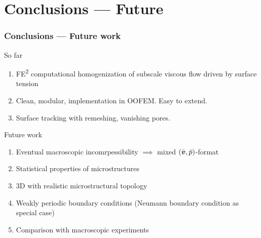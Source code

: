 \documentclass[11pt]{beamer} %
\begin{document}
\section{Conclusions --- Future}
\begin{frame}
 \frametitle{Conclusions --- Future work}
 So far
 \begin{enumerate}
  \item FE\textsuperscript{2} computational homogenization of subscale viscous flow driven by surface tension
  \item Clean, modular, implementation in OOFEM. Easy to extend.
  \item Surface tracking with remeshing, vanishing pores.
 \end{enumerate}

 Future work
 \begin{enumerate}
  \item Eventual macroscopic incomrpessibility $\implies$ mixed $(\bar{\boldsymbol{v}},\bar{p})$-format
  \item Statistical properties of microstructures
  \item 3D with realistic microstructural topology
  \item Weakly periodic boundary conditions (Neumann boundary condition as special case)
  \item Comparison with macroscopic experiments
 \end{enumerate}

\end{frame}

\end{document}
